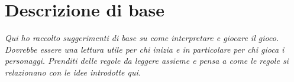\chapter{Descrizione di base}

\textit{Qui ho raccolto suggerimenti di base su come interpretare e giocare il gioco. Dovrebbe essere una lettura utile per chi inizia e in particolare per chi gioca i personaggi. Prenditi delle regole da leggere assieme e pensa a come le regole si relazionano con le idee introdotte qui.}

\clearpage

\clearpage


\clearpage

\clearpage

